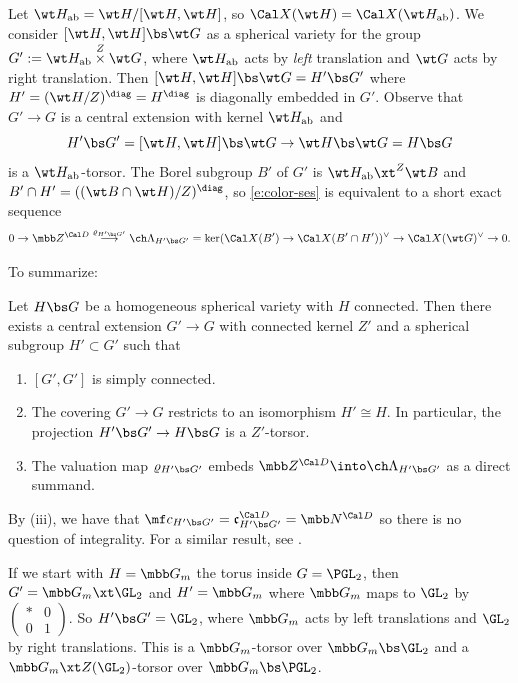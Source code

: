 Let $\wt H_{\mathrm{ab}} = \wt H/[\wt H,\wt H]$, so
$\Cal X(\wt H) = \Cal X(\wt H_{\mathrm{ab}})$.
We consider $[\wt H,\wt H] \bs \wt G$
as a spherical variety for the group $G' := \wt H_{\mathrm{ab}} \overset Z\times \wt G$,
where $\wt H_{\mathrm{ab}}$ acts by \emph{left} translation and
$\wt G$ acts by right translation.
Then
$[\wt H,\wt H] \bs \wt G = H' \bs G'$
where $H'=(\wt H/Z)^\diag=H^\diag$ is diagonally embedded in $G'$.
Observe that $G' \to G$ is a central extension
with kernel $\wt H_{\mathrm{ab}}$
and
\[ H'\bs G' = [\wt H,\wt H]\bs \wt G \to \wt H \bs \wt G = H\bs G \]
is a $\wt H_{\mathrm{ab}}$-torsor.
The Borel subgroup $B'$ of $G'$ is $\wt H_{\mathrm{ab}} \xt^Z \wt B$
and $B'\cap H' = ((\wt B \cap \wt H)/Z)^\diag$, so
 \eqref{e:color-ses} is equivalent to a short exact sequence
\[
    0 \to \mbb Z^{\Cal D} \overset{\varrho_{H'\bs G'}}\longrightarrow
    \ch\Lambda_{H'\bs G'} = \ker(\Cal X(B')\to \Cal X(B'\cap H'))^\vee
    \to \Cal X(\wt G)^\vee \to 0.
\]

To summarize:
\begin{lem}
\notready \label{lem:Xcover}
Let $H\bs G$ be a homogeneous spherical variety with $H$ connected.
Then there exists a central extension $G' \to G$
with connected kernel $Z'$ and a spherical
subgroup $H'\subset G'$ such that
\begin{enumerate}
\item $[G',G']$ is simply connected.
\item The covering $G'\to G$ restricts to an isomorphism $H'\cong H$.
In particular,
the projection $H' \bs G' \to H \bs G$ is a $Z'$-torsor.
\item
The valuation map $\varrho_{H'\bs G'}$ embeds
$\mbb Z^{\Cal D} \into \ch\Lambda_{H'\bs G'}$
as a direct summand.
\end{enumerate}
\end{lem}



 By (iii), we have that $\mf c_{H'\bs G'} = \mathfrak c^{\Cal D}_{H'\bs G'}= \mbb N^{\Cal D}$ so there is no question of integrality. For a similar result, see \cite[Lemma 2.1.1]{Brion07}.

\begin{eg}
\notready
If we start with $H = \mbb G_m$ the torus inside $G = \PGL_2$, then
$G' = \mbb G_m \xt \GL_2$ and $H'= \mbb G_m$ where $\mbb G_m$
maps to $\GL_2$ by $\left( \begin{smallmatrix} * & 0 \\ 0 & 1 \end{smallmatrix} \right)$. So $H'\bs G' = \GL_2$, where $\mbb G_m$ acts by
left translations and $\GL_2$ by right translations.
This is a $\mbb G_m$-torsor over $\mbb G_m \bs \GL_2$ and a
$\mbb G_m \xt Z(\GL_2)$-torsor over $\mbb G_m \bs \PGL_2$.
\end{eg}



